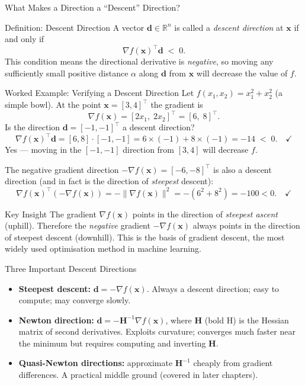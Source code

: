 \documentclass[aspectratio=169,10pt]{beamer}
\newcommand{\bx}{\mathbf{x}}
\newcommand{\bd}{\mathbf{d}}
\newcommand{\bH}{\mathbf{H}}
\newcommand{\R}{\mathbb{R}}
\newcommand{\grad}{\nabla}
\begin{document}
\begin{frame}[allowframebreaks]{What Makes a Direction a ``Descent'' Direction?}
  \begin{block}{Definition: Descent Direction}
    A vector $\bd \in \R^n$ is called a \emph{descent direction} at $\bx$
    if and only if
    \[
      \grad f(\bx)^{\top}\bd \;<\; 0.
    \]
    This condition means the directional derivative is \emph{negative},
    so moving any sufficiently small positive distance $\alpha$ along
    $\bd$ from $\bx$ will decrease the value of $f$.
  \end{block}

  \framebreak

  \begin{exampleblock}{Worked Example: Verifying a Descent Direction}
    Let $f(x_1, x_2) = x_1^2 + x_2^2$ (a simple bowl).  At the point
    $\bx = [3, 4]^{\top}$ the gradient is
    \[
      \grad f(\bx) = [2x_1,\; 2x_2]^{\top} = [6,\; 8]^{\top}.
    \]
    Is the direction $\bd = [-1, -1]^{\top}$ a descent direction?
    \[
      \grad f(\bx)^{\top}\bd
      = [6, 8] \cdot [-1, -1]
      = 6\times(-1) + 8\times(-1)
      = -14 \;<\; 0. \quad \checkmark
    \]
    Yes --- moving in the $[-1,-1]$ direction from $[3,4]$ will
    decrease $f$.

    The negative gradient direction $-\grad f(\bx) = [-6,-8]^{\top}$
    is also a descent direction (and in fact is the direction of
    \emph{steepest} descent):
    \[
      \grad f(\bx)^{\top}(-\grad f(\bx))
      = -\|\grad f(\bx)\|^2 = -(6^2+8^2) = -100 < 0. \quad \checkmark
    \]
  \end{exampleblock}

  \begin{alertblock}{Key Insight}
    The gradient $\grad f(\bx)$ points in the direction of \emph{steepest
    ascent} (uphill).  Therefore the \emph{negative} gradient
    $-\grad f(\bx)$ always points in the direction of steepest descent
    (downhill).  This is the basis of gradient descent, the most widely
    used optimisation method in machine learning.
  \end{alertblock}

  \begin{block}{Three Important Descent Directions}
    \begin{itemize}
      \item \textbf{Steepest descent:} $\bd = -\grad f(\bx)$.  Always a
            descent direction; easy to compute; may converge slowly.
      \item \textbf{Newton direction:} $\bd = -\bH^{-1}\grad f(\bx)$,
            where $\bH$ (bold H) is the Hessian matrix of second
            derivatives.  Exploits curvature; converges much faster near
            the minimum but requires computing and inverting $\bH$.
      \item \textbf{Quasi-Newton directions:} approximate $\bH^{-1}$
            cheaply from gradient differences.  A practical middle ground
            (covered in later chapters).
    \end{itemize}
  \end{block}

\end{frame}
\end{document}
